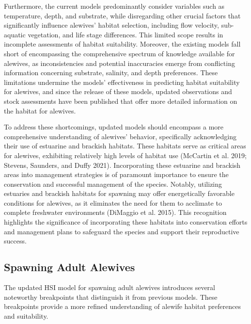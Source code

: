 \documentclass[
]{book}
\begin{document}
Furthermore, the current models predominantly consider variables such as temperature, depth, and substrate, while disregarding other crucial factors that significantly influence alewives' habitat selection, including flow velocity, sub-aquatic vegetation, and life stage differences.
This limited scope results in incomplete assessments of habitat suitability.
Moreover, the existing models fall short of encompassing the comprehensive spectrum of knowledge available for alewives, as inconsistencies and potential inaccuracies emerge from conflicting information concerning substrate, salinity, and depth preferences.
These limitations undermine the models' effectiveness in predicting habitat suitability for alewives, and since the release of these models, updated observations and stock assessments have been published that offer more detailed information on the habitat for alewives.

To address these shortcomings, updated models should encompass a more comprehensive understanding of alewives' behavior, specifically acknowledging their use of estuarine and brackish habitats.
These habitats serve as critical areas for alewives, exhibiting relatively high levels of habitat use (McCartin et al. 2019; Stevens, Saunders, and Duffy 2021).
Incorporating these estuarine and brackish areas into management strategies is of paramount importance to ensure the conservation and successful management of the species.
Notably, utilizing estuaries and brackish habitats for spawning may offer energetically favorable conditions for alewives, as it eliminates the need for them to acclimate to complete freshwater environments (DiMaggio et al. 2015).
This recognition highlights the significance of incorporating these habitats into conservation efforts and management plans to safeguard the species and support their reproductive success.

\hypertarget{spawning-adult-alewives-1}{%
\subsection{Spawning Adult Alewives}\label{spawning-adult-alewives-1}}

The updated HSI model for spawning adult alewives introduces several noteworthy breakpoints that distinguish it from previous models.
These breakpoints provide a more refined understanding of alewife habitat preferences and suitability.
\end{document}
